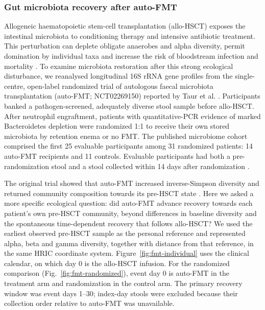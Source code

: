 \subsubsection{Gut microbiota recovery after auto-FMT}

Allogeneic haematopoietic stem-cell transplantation (allo-HSCT) exposes the
intestinal microbiota to conditioning therapy and intensive antibiotic
treatment. This perturbation can deplete obligate anaerobes and alpha diversity,
permit domination by individual taxa and increase the risk of bloodstream
infection and mortality \cite{taur2012domination,shono2016antibiotics,
peled2020microbiota}. To examine microbiota restoration after this strong
ecological disturbance, we reanalysed longitudinal 16S rRNA gene profiles from
the single-centre, open-label randomized trial of autologous faecal microbiota
transplantation (auto-FMT; NCT02269150) reported by Taur et al.
\cite{taur2018reconstitution}. Participants banked a pathogen-screened,
adequately diverse stool sample before allo-HSCT. After neutrophil engraftment,
patients with quantitative-PCR evidence of marked Bacteroidetes depletion were
randomized 1:1 to receive their own stored microbiota by retention enema or no
FMT. The published microbiome cohort comprised the first 25 evaluable
participants among 31 randomized patients: 14 auto-FMT recipients and 11
controls. Evaluable participants had both a pre-randomization stool and a stool
collected within 14 days after randomization \cite{taur2018reconstitution}.

The original trial showed that auto-FMT increased inverse-Simpson diversity and
returned community composition towards its pre-HSCT state
\cite{taur2018reconstitution}. Here we asked a more specific ecological
question: did auto-FMT advance recovery towards each patient's own pre-HSCT
community, beyond differences in baseline diversity and the spontaneous
time-dependent recovery that follows allo-HSCT? We used the earliest observed
pre-HSCT sample as the personal reference and represented alpha, beta and gamma
diversity, together with distance from that reference, in the same HRIC
coordinate system. Figure~\ref{fig:fmt-individual} uses the clinical calendar,
on which day 0 is the allo-HSCT infusion. For the randomized comparison
(Fig.~\ref{fig:fmt-randomized}), event day 0 is auto-FMT in the treatment arm
and randomization in the control arm. The primary recovery window was event
days 1--30; index-day stools were excluded because their collection order
relative to auto-FMT was unavailable.

